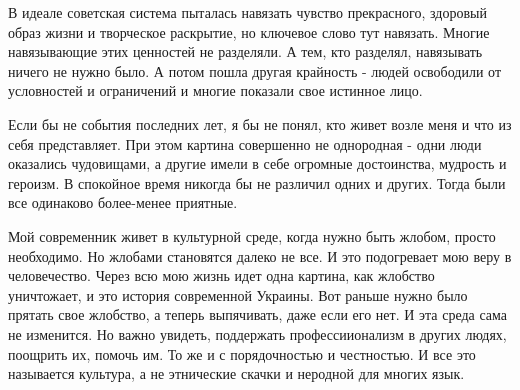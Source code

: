 В идеале советская система пыталась навязать чувство прекрасного, здоровый
образ жизни и творческое раскрытие, но ключевое слово тут навязать. Многие
навязывающие этих ценностей не разделяли. А тем, кто разделял, навязывать
ничего не нужно было. А потом пошла другая крайность - людей освободили от
условностей и ограничений и многие показали свое истинное лицо. 

Если бы не события последних лет, я бы не понял, кто живет возле меня и что из
себя представляет. При этом картина совершенно не однородная - одни люди
оказались чудовищами, а другие имели в себе огромные достоинства, мудрость и
героизм. В спокойное время никогда бы не различил одних и других. Тогда были
все одинаково более-менее приятные. 

Мой современник живет в культурной среде, когда нужно быть жлобом, просто
необходимо. Но жлобами становятся далеко не все. И это подогревает мою веру в
человечество. Через всю мою жизнь идет одна картина, как жлобство уничтожает, и
это история современной Украины. Вот раньше нужно было прятать свое жлобство, а
теперь выпячивать, даже если его нет. И эта среда сама не изменится. Но важно
увидеть, поддержать профессиионализм в других людях, поощрить их, помочь им. То
же и с порядочностью и честностью. И все это называется культура, а не
этнические скачки и неродной для многих язык.

